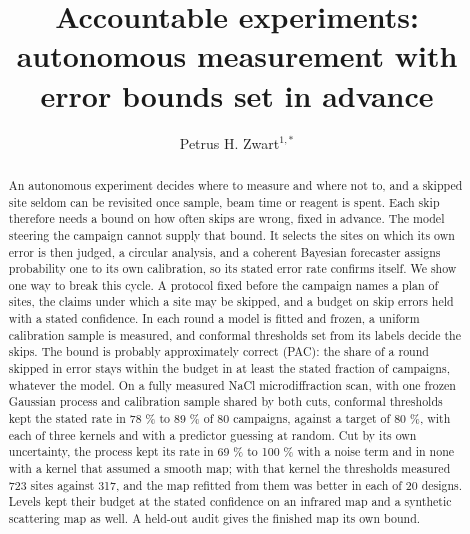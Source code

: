 \documentclass{iopjournal}
\begin{document}

\title{Accountable experiments: autonomous measurement with error bounds set in advance}

\author{Petrus H. Zwart$^{1,*}$}





\begin{abstract}
An autonomous experiment decides where to measure and where not to, and a skipped site seldom can be revisited once sample, beam time or reagent is spent. Each skip therefore needs a bound on how often skips are wrong, fixed in advance. The model steering the campaign cannot supply that bound. It selects the sites on which its own error is then judged, a circular analysis, and a coherent Bayesian forecaster assigns probability one to its own calibration, so its stated error rate confirms itself. We show one way to break this cycle. A protocol fixed before the campaign names a plan of sites, the claims under which a site may be skipped, and a budget on skip errors held with a stated confidence. In each round a model is fitted and frozen, a uniform calibration sample is measured, and conformal thresholds set from its labels decide the skips. The bound is probably approximately correct (PAC): the share of a round skipped in error stays within the budget in at least the stated fraction of campaigns, whatever the model. On a fully measured NaCl microdiffraction scan, with one frozen Gaussian process and calibration sample shared by both cuts, conformal thresholds kept the stated rate in 78 \% to 89 \% of 80 campaigns, against a target of 80 \%, with each of three kernels and with a predictor guessing at random. Cut by its own uncertainty, the process kept its rate in 69 \% to 100 \% with a noise term and in none with a kernel that assumed a smooth map; with that kernel the thresholds measured 723 sites against 317, and the map refitted from them was better in each of 20 designs. Levels kept their budget at the stated confidence on an infrared map and a synthetic scattering map as well. A held-out audit gives the finished map its own bound.
\end{abstract}
\end{document}
